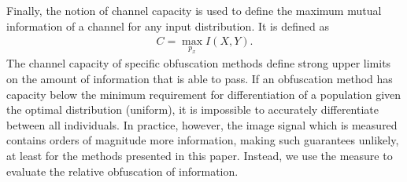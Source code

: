 Finally, the notion of channel capacity is used to define the maximum mutual information of a channel for any input distribution. It is defined as
\begin{align}
    C = \max_{p_x} I(X, Y).
\end{align}
The channel capacity of specific obfuscation methods define strong upper limits on the amount of information that is able to pass. If an obfuscation method has capacity below the minimum requirement for differentiation of a population given the optimal distribution (uniform), it is impossible to accurately differentiate between all individuals. In practice, however, the image signal which is measured contains orders of magnitude more information, making such guarantees unlikely, at least for the methods presented in this paper. Instead, we use the measure to evaluate the relative obfuscation of information.







